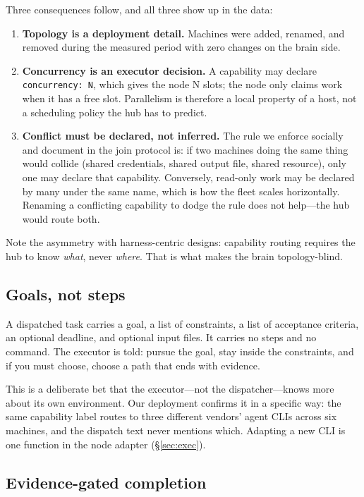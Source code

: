 \documentclass{article}
\begin{document}
Three consequences follow, and all three show up in the data:
\begin{enumerate}[leftmargin=1.4em,itemsep=1pt,topsep=2pt]
  \item \textbf{Topology is a deployment detail.} Machines were added, renamed, and
        removed during the measured period with zero changes on the brain side.
  \item \textbf{Concurrency is an executor decision.} A capability may declare
        \texttt{concurrency: N}, which gives the node N slots; the node only claims
        work when it has a free slot. Parallelism is therefore a local property of a
        host, not a scheduling policy the hub has to predict.
  \item \textbf{Conflict must be declared, not inferred.} The rule we enforce socially
        and document in the join protocol is: if two machines doing the same thing
        would collide (shared credentials, shared output file, shared resource), only
        one may declare that capability. Conversely, read-only work may be declared
        by many under the same name, which is how the fleet scales horizontally.
        Renaming a conflicting capability to dodge the rule does not help---the hub
        would route both.
\end{enumerate}

Note the asymmetry with harness-centric designs: capability routing requires the
hub to know \emph{what}, never \emph{where}. That is what makes the brain
topology-blind.

\subsection{Goals, not steps}

A dispatched task carries a goal, a list of constraints, a list of acceptance
criteria, an optional deadline, and optional input files. It carries no steps and no
command. The executor is told: pursue the goal, stay inside the constraints, and if
you must choose, choose a path that ends with evidence.

This is a deliberate bet that the executor---not the dispatcher---knows more about its
own environment. Our deployment confirms it in a specific way: the same capability
label routes to three different vendors' agent CLIs across six machines, and the
dispatch text never mentions which. Adapting a new CLI is one function in the node
adapter (\S\ref{sec:exec}).

\subsection{Evidence-gated completion}
\label{sec:evidence}
\end{document}
